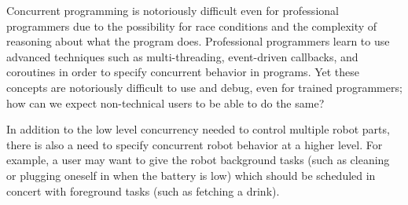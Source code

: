 \documentclass[10pt,twocolumn]{article}
\begin{document}
\begin{changebar}
Concurrent programming is notoriously difficult even for professional programmers due to the possibility for race conditions and the complexity of reasoning about what the program does. Professional programmers learn to use advanced techniques such as multi-threading, event-driven callbacks, and coroutines in order to specify concurrent behavior in programs. Yet these concepts are notoriously difficult to use and debug, even for trained programmers; how can we expect non-technical users to be able to do the same?

In addition to the low level concurrency needed to control multiple robot parts, there is also a need to specify concurrent robot behavior at a higher level. For example, a user may want to give the robot background tasks (such as cleaning or plugging oneself in when the battery is low) which should be scheduled in concert with foreground tasks (such as fetching a drink).
\end{changebar}



\end{document}
